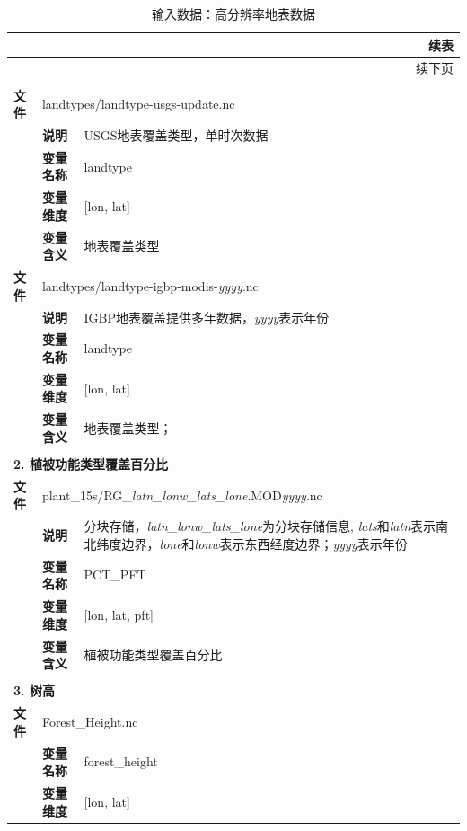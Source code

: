\documentclass[a4paper,12pt,twoside]{article}
\begin{document}
{\small
\begin{longtable}{llp{}}
\caption{输入数据：高分辨率地表数据} \label{table_hires_rawdata} \\

\toprule
\endfirsthead
\multicolumn{3}{r}{{续表}} \\
\toprule
\endhead
\midrule
\multicolumn{3}{r}{{续下页}} \\
\endfoot
\bottomrule
\endlastfoot

\multicolumn{3}{l}{\textbf{1. 地表覆盖类型}} \\
\midrule
\textbf{文件} & \multicolumn{2}{l}{landtypes/landtype-usgs-update.nc} \\
&\textbf{说明} & USGS地表覆盖类型，单时次数据 \\
\cline{2-3}
&\textbf{变量名称} & landtype \\
&\textbf{变量维度} & {[}lon, lat{]}\\
&\textbf{变量含义} & 地表覆盖类型 \\
\cline{1-3}
\textbf{文件} & \multicolumn{2}{l}{landtypes/landtype-igbp-modis-\textit{yyyy}.nc} \\
&\textbf{说明} & IGBP地表覆盖提供多年数据，\textit{yyyy}表示年份 \\
\cline{2-3}
&\textbf{变量名称} & landtype \\
&\textbf{变量维度} & {[}lon, lat{]}\\
&\textbf{变量含义} & 地表覆盖类型； \\
\midrule
\vspace{2\baselineskip}\\
\multicolumn{3}{l}{\textbf{2. 植被功能类型覆盖百分比}} \\
\cline{1-3}
\textbf{文件} & \multicolumn{2}{l}{plant\_15s/RG\_\textit{latn\_lonw\_lats\_lone}.MOD\textit{yyyy}.nc} \\
& \textbf{说明} & 分块存储，\textit{latn\_lonw\_lats\_lone}为分块存储信息,  \textit{lats}和\textit{latn}表示南北纬度边界，\textit{lone}和\textit{lonw}表示东西经度边界；\textit{yyyy}表示年份 \\
\cline{2-3}
 & \textbf{变量名称} & PCT\_PFT \\
 & \textbf{变量维度} & {[}lon, lat, pft{]} \\
 & \textbf{变量含义} & 植被功能类型覆盖百分比 \\

\midrule
\vspace{2\baselineskip}\\
 \multicolumn{3}{l}{\textbf{3. 树高}} \\
\cline{1-3}
\textbf{文件} & \multicolumn{2}{l}{Forest\_Height.nc} \\
\cline{2-3}
& \textbf{变量名称} & forest\_height \\
& \textbf{变量维度} & {[}lon, lat{]} \\


\end{longtable}}
\end{document}
